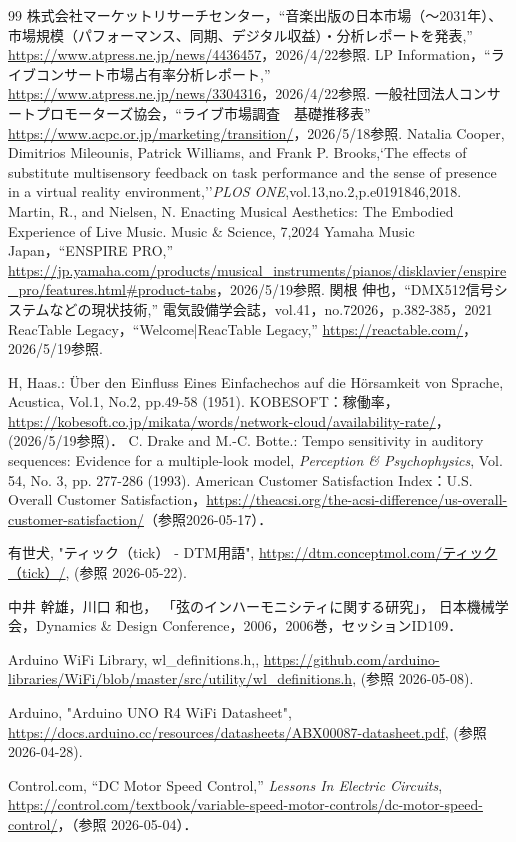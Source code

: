 \documentclass[lualatex,book,paper=a4paper,jafontsize=11.5pt,jafontscale=1.05]{jlreq}
\begin{document}
\clearpage
\begin{thebibliography}{99}
 株式会社マーケットリサーチセンター，``音楽出版の日本市場（～2031年）、市場規模（パフォーマンス、同期、デジタル収益）・分析レポートを発表,'' \url{https://www.atpress.ne.jp/news/4436457}，2026/4/22参照.
 LP Information，``ライブコンサート市場占有率分析レポート,'' \url{https://www.atpress.ne.jp/news/3304316}，2026/4/22参照.
 一般社団法人コンサートプロモーターズ協会，``ライブ市場調査　基礎推移表'' \url{https://www.acpc.or.jp/marketing/transition/}，2026/5/18参照.
 Natalia Cooper, Dimitrios Mileounis, Patrick Williams, and Frank P. Brooks,`The effects of substitute multisensory feedback on task performance and the sense of presence in a virtual reality environment,''\textit{PLOS ONE},vol.13,no.2,p.e0191846,2018.
  Martin, R., and Nielsen, N. Enacting Musical Aesthetics: The Embodied Experience of Live Music. Music \& Science, 7,2024
 Yamaha Music Japan，``ENSPIRE PRO,'' \url{https://jp.yamaha.com/products/musical_instruments/pianos/disklavier/enspire_pro/features.html#product-tabs}，2026/5/19参照.
 関根 伸也，``DMX512信号システムなどの現状技術,'' 電気設備学会誌，vol.41，no.72026，p.382-385，2021
 ReacTable Legacy，``Welcome|ReacTable Legacy,'' \url{https://reactable.com/}，2026/5/19参照.


 H, Haas.: Über den Einfluss Eines Einfachechos auf die Hörsamkeit von Sprache, Acustica, Vol.1, No.2, pp.49-58 (1951). 
KOBESOFT：稼働率，
	\url{https://kobesoft.co.jp/mikata/words/network-cloud/availability-rate/}，
		(2026/5/19参照)．
C. Drake and M.-C. Botte.:
Tempo sensitivity in auditory sequences: Evidence for a multiple-look model,
\textit{Perception \& Psychophysics},
		Vol. 54, No. 3, pp. 277-286 (1993).
	 American Customer Satisfaction Index：U.S. Overall Customer Satisfaction，\url{https://theacsi.org/the-acsi-difference/us-overall-customer-satisfaction/}（参照2026-05-17）．

 有世犬, "ティック（tick） - DTM用語", \url{https://dtm.conceptmol.com/ティック（tick）/}, (参照 2026-05-22).

中井 幹雄，川口 和也，
「弦のインハーモニシティに関する研究」，
日本機械学会，Dynamics \& Design Conference，2006，2006巻，セッションID109．

 Arduino WiFi Library, wl\_definitions.h,, \url{https://github.com/arduino-libraries/WiFi/blob/master/src/utility/wl_definitions.h}, (参照 2026-05-08).

 Arduino, "Arduino UNO R4 WiFi Datasheet", \url{https://docs.arduino.cc/resources/datasheets/ABX00087-datasheet.pdf}, (参照 2026-04-28).

Control.com, ``DC Motor Speed Control,'' {\em Lessons In Electric Circuits}, \\
\url{https://control.com/textbook/variable-speed-motor-controls/dc-motor-speed-control/}，（参照 2026-05-04）．

\end{thebibliography}
\end{document}
